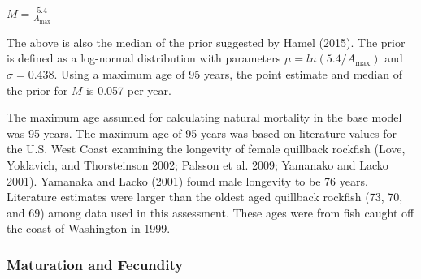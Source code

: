 \documentclass[11pt,
  english,
  a4paper,
]{article}
\begin{document}
\leavevmode\tagmcend\tagstructend\par

\begin{centering}

$M=\frac{5.4}{A_{\text{max}}}$

\end{centering}


The above is also the median of the prior suggested by Hamel {(2015)\leavevmode\tagmcend\tagstructend}. The prior is defined as a log-normal distribution with parameters {\(\mu = ln(5.4/A_{\text{max}})\)\leavevmode\tagmcend\tagstructend} and {\(\sigma = 0.438\)\leavevmode\tagmcend\tagstructend}. Using a maximum age of 95 years, the point estimate and median of the prior for {\(M\)\leavevmode\tagmcend\tagstructend} is 0.057 per year.

\leavevmode\tagmcend\tagstructend\par


The maximum age assumed for calculating natural mortality in the base model was 95 years. The maximum age of 95 years was based on literature values for the U.S. West Coast examining the longevity of female quillback rockfish {(Love, Yoklavich, and Thorsteinson 2002; Palsson et al. 2009; Yamanako and Lacko 2001)\leavevmode\tagmcend\tagstructend}. Yamanaka and Lacko {(2001)\leavevmode\tagmcend\tagstructend} found male longevity to be 76 years. Literature estimates were larger than the oldest aged quillback rockfish (73, 70, and 69) among data used in this assessment. These ages were from fish caught off the coast of Washington in 1999.

\leavevmode\tagmcend\tagstructend\par


\hypertarget{maturation-and-fecundity}{%
\subsubsection{Maturation and Fecundity}\label{maturation-and-fecundity}}
\end{document}
